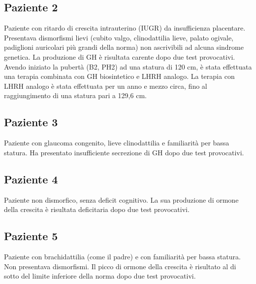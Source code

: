 \subsection*{Paziente 2}%

Paziente con ritardo di crescita intrauterino (IUGR) da insufficienza placentare.
Presentava dismorfismi lievi (cubito valgo, clinodattilia lieve, palato ogivale, padiglioni auricolari più grandi della norma) non ascrivibili ad alcuna sindrome genetica. La produzione di GH è risultata carente dopo due test provocativi. Avendo iniziato la pubertà (B2, PH2) ad una statura di 120 cm, è stata effettuata una terapia combinata con GH biosintetico e LHRH analogo. La terapia con LHRH analogo è stata effettuata per un anno e mezzo circa, fino al raggiungimento di una statura pari a 129,6 cm.

\clearpage

\subsection*{Paziente 3}%

Paziente con glaucoma congenito, lieve clinodattilia e familiarità per bassa statura. Ha presentato insufficiente secrezione di GH  dopo due test provocativi.

\clearpage

\subsection*{Paziente 4}%

Paziente non dismorfico, senza deficit cognitivo. La sua produzione di ormone della crescita è risultata deficitaria dopo due test provocativi.

\clearpage

\subsection*{Paziente 5}%

Paziente con brachidattilia (come il padre) e con familiarità per bassa statura. Non presentava dismorfismi. Il picco di ormone della crescita è risultato al di sotto del limite inferiore della norma dopo due test provocativi.

